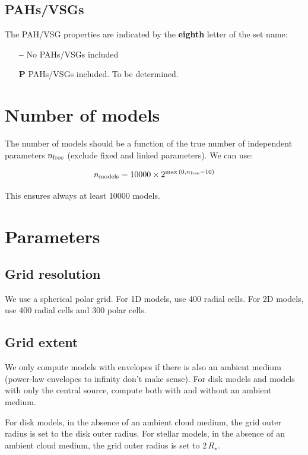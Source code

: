 \documentclass[10pt]{article}
\begin{document}
\subsection{PAHs/VSGs}

The PAH/VSG properties are indicated by the \textbf{eighth} letter of the set name:

\begin{itemize}

\item[\textbf{--}] No PAHs/VSGs included

\item[\textbf{P}] PAHs/VSGs included. To be determined.
      
\end{itemize}

\section{Number of models}

The number of models should be a function of the true number of independent parameters $n_{\rm free}$ (exclude fixed and linked parameters). We can use:

$$
n_{\rm models} = 10000 \times 2^{\max{(0, n_{\rm free}-10)}}
$$

This ensures always at least 10000 models.

\section{Parameters}

\subsection{Grid resolution}

We use a spherical polar grid. For 1D models, use 400 radial cells. For 2D models, use 400 radial cells and 300 polar cells.

\subsection{Grid extent}

We only compute models with envelopes if there is also an ambient medium (power-law envelopes to infinity don't make sense). For disk models and models with only the central source, compute both with and without an ambient medium.

For disk models, in the absence of an ambient cloud medium, the grid outer radius is set to the disk outer radius. For stellar models, in the absence of an ambient cloud medium, the grid outer radius is set to 2\,$R_\star$.
\end{document}
